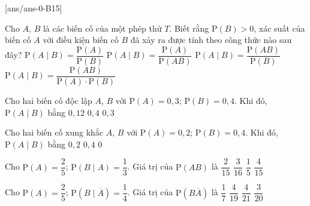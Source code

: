[ans/ans-0-B15]
\begin{ex}%
	Cho $A$, $B$ là các biến cố của một phép thử $T$. Biết rằng $\mathrm{P}(B)>0$, xác suất của biến cố $A$ với điều kiện biến cố $B$ đã xảy ra được tính theo công thức nào sau đây?
	\choice
	{$\mathrm{P}(A\mid B)=\dfrac{\mathrm{P}(A)}{\mathrm{P}(B)}$}
	{$\mathrm{P}(A\mid B)=\dfrac{\mathrm{P}(A)}{\mathrm{P}(A B)}$}
	{\True $\mathrm{P}(A\mid B)=\dfrac{\mathrm{P}(A B)}{\mathrm{P}(B)}$}
	{$\mathrm{P}(A\mid B)=\dfrac{\mathrm{P}(A B)}{\mathrm{P}(A) \cdot \mathrm{P}(B)}$}
\end{ex}
\begin{ex}%
	Cho hai biến cố độc lập $A$, $B$ với $\mathrm{P}(A)=0{,}3$; $\mathrm{P}(B)=0{,}4$. Khi đó, $\mathrm{P}(A\mid B)$ bằng
	{$0{,}12$}
	{$0{,}4$}
	{\True $0{,}3$}
\end{ex}
\begin{ex}%
	Cho hai biến cố xung khắc $A$, $B$ với $\mathrm{P}(A)=0{,}2$; $\mathrm{P}(B)=0{,}4$. Khi đó, $\mathrm{P}(A\mid B)$ bằng
	{$0{,}2$}
	{$0{,}4$}
	{\True $0$}
\end{ex}
\begin{ex}%
	Cho $\mathrm{P}(A)=\dfrac{2}{5}$; $\mathrm{P}\left( B\mid A\right)=\dfrac{1}{3}$. Giá trị của $\mathrm{P}(AB)$ là 
	\choice
	{\True $\dfrac{2}{15} $}
	{$ \dfrac{3}{16}$}
	{$ \dfrac{1}{5}$}
	{$ \dfrac{4}{15}$}
\end{ex}
\begin{ex}%
	Cho $\mathrm{P}(A)=\dfrac{2}{5}$; $\mathrm{P}\left(B\mid \overline{A}\right)=\dfrac{1}{4}$. Giá trị của $\mathrm{P}\left(B\overline{A}\right)$ là 
	\choice
	{$\dfrac{1}{7} $}
	{$ \dfrac{4}{19}$}
	{$ \dfrac{4}{21}$}
	{\True $ \dfrac{3}{20}$}
\end{ex}
